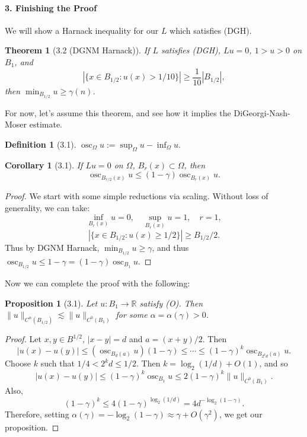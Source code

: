 \documentclass[UTF8,11pt]{ctexart}
\newtheorem*{theorem}{Theorem}
\newtheorem*{proposition}{Proposition}
\newtheorem*{corollary}{Corollary}
\theoremstyle{definition}
\newtheorem*{definition}{Definition}
\newcommand{\R}{\mathbb R}
\begin{document}
\paragraph{3. Finishing the Proof}
We will show a Harnack inequality for our $L$ which satisfies (DGH).
\begin{theorem}[3.2 (DGNM Harnack)]
If $L$ satisfies (DGH), $Lu=0$, $1>u>0$ on $B_1$, and
\[|\{x\in B_{1/2}:u(x)>1/10\}|\geq\frac1{10}|B_{1/2}|,\tag{P}\]
then $\min_{B_{1/2}}u\geq\gamma(n)$.
\end{theorem}
For now, let's assume this theorem, and see how it implies the DiGeorgi-Nash-Moser estimate.
\begin{definition}[3.1]
$\operatorname{osc}_\Omega u:=\sup_\Omega u-\inf_\Omega u$.
\end{definition}
\begin{corollary}[3.1]
If $Lu=0$ on $\Omega$, $B_r(x)\subset\Omega$, then
\[\operatorname{osc}_{B_{r/2}(x)}u\leq(1-\gamma)\operatorname{osc}_{B_r(x)}u.\tag{O}\]
\end{corollary}
\begin{proof}
We start with some simple reductions via scaling. Without loss of generality, we can take:
\[\inf_{B_r(x)}u=0,\quad\sup_{B_r(x)}u=1,\quad r=1,\]
\[|\{x\in B_{1/2}:u(x)\geq1/2\}|\geq B_{1/2}/2.\]
Thus by DGNM Harnack, $\min_{B_{1/2}}u\geq\gamma$, and thus $\operatorname{osc}_{B_{1/2}}u\leq1-\gamma=(1-\gamma)\operatorname{osc}_{B_1}u$.
\end{proof}
Now we can complete the proof with the following:
\begin{proposition}[3.1]
Let $u:B_1\to\R$ satisfy (O). Then $\|u\|_{C^\alpha(B_{1/2})}\lesssim\|u\|_{C^0(B_1)}$ for some $\alpha=\alpha(\gamma)>0$.
\end{proposition}
\begin{proof}
Let $x,y\in B^{1/2}$, $|x-y|=d$ and $a=(x+y)/2$. Then
\[|u(x)-u(y)|\leq(\operatorname{osc}_{B_d(a)}u)(1-\gamma)\leq\cdots\leq(1-\gamma)^k\operatorname{osc}_{B_{2^kd}(a)}u.\]
Choose $k$ such that $1/4<2^kd\leq1/2$. Then $k=\log_2(1/d)+O(1)$, and so
\[|u(x)-u(y)|\leq(1-\gamma)^k\operatorname{osc}_{B_1}u\leq2(1-\gamma)^k\|u\|_{C^0(B_1)}.\]
Also,
\[(1-\gamma)^k\leq4(1-\gamma)^{\log_2(1/d)}=4d^{-\log_2(1-\gamma)}.\]
Therefore, setting $\alpha(\gamma)=-\log_2(1-\gamma)\approx\gamma+O(\gamma^2)$, we get our proposition.
\end{proof}
\end{document}
